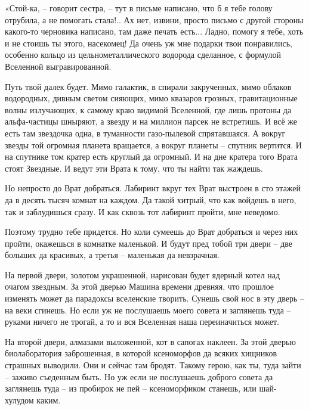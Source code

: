 \documentclass[ebook,oneside,final,openright]{memoir}
\begin{document}
\par
«Стой-ка, – говорит сестра, – тут в письме написано, что б я тебе голову отрубила, а не помогать стала!.. Ах нет, извини, просто письмо с другой стороны какого-то черновика написано, там даже печать есть... Ладно, помогу я тебе, хоть и не стоишь ты этого, насекомец! Да очень уж мне подарки твои понравились, особенно кольцо из цельнометаллического водорода сделанное, с формулой Вселенной выгравированной.\par
\par
Путь твой далек будет. Мимо галактик, в спирали закрученных, мимо облаков водородных, дивным светом сияющих, мимо квазаров грозных, гравитационные волны излучающих, к самому краю видимой Вселенной, где лишь протоны да альфа-частицы шныряют, а звезду и на миллион парсек не встретишь. И всё же есть там звездочка одна, в туманности газо-пылевой спрятавшаяся. А вокруг звезды той огромная планета вращается, а вокруг планеты – спутник вертится. И на спутнике том кратер есть круглый да огромный. И на дне кратера того Врата стоят Звездные. И ведут эти Врата к тому, что ты найти так жаждешь.\par
\par
Но непросто до Врат добраться. Лабиринт вкруг тех Врат выстроен в сто этажей да в десять тысяч комнат на каждом. Да такой хитрый, что как войдешь в него, так и заблудишься сразу. И как сквозь тот лабиринт пройти, мне неведомо.\par
\par
Поэтому трудно тебе придется. Но коли сумеешь до Врат добраться и через них пройти, окажешься в комнатке маленькой. И будут пред тобой три двери – две больших да красивых, а третья – маленькая да невзрачная.\par
\par
На первой двери, золотом украшенной, нарисован будет ядерный котел над очагом звездным. За этой дверью Машина времени древняя, что прошлое изменять может да парадоксы вселенские творить. Сунешь свой нос в эту дверь – на веки сгинешь. Но если уж не послушаешь моего совета и заглянешь туда – руками ничего не трогай, а то и вся Вселенная наша переиначиться может.\par
\par
На второй двери, алмазами выложенной, кот в сапогах наклеен. За этой дверью биолаборатория заброшенная, в которой ксеноморфов да всяких хищников страшных выводили. Они и сейчас там бродят. Такому герою, как ты, туда зайти – заживо съеденным быть. Но уж если не послушаешь доброго совета да заглянешь туда – из пробирок не пей – ксеноморфиком станешь, или шай-хулудом каким.\par
\end{document}
